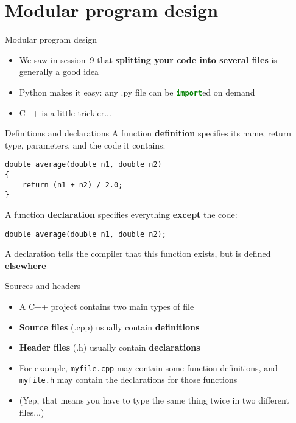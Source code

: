 \part{Modular program design}
\frame{\partpage}

\begin{frame}[fragile]{Modular program design}
    \begin{itemize}
        \item We saw in session~9 that \textbf{splitting your code into several files} is generally a good idea \pause
        \item Python makes it easy: any .py file can be \lstinline[language=Python]{import}ed on demand \pause
        \item C++ is a little trickier...
    \end{itemize}
\end{frame}

\begin{frame}[fragile]{Definitions and declarations}
    A function \textbf{definition} specifies its name, return type, parameters, and the code it contains:
    \begin{lstlisting}
double average(double n1, double n2)
{
    return (n1 + n2) / 2.0;
}
    \end{lstlisting}
    \pause
    A function \textbf{declaration} specifies everything \textbf{except} the code:
    \begin{lstlisting}
double average(double n1, double n2);
    \end{lstlisting}
    \pause
    A declaration tells the compiler that this function exists, but is defined \textbf{elsewhere}
\end{frame}

\begin{frame}[fragile]{Sources and headers}
    \begin{itemize}
        \item A C++ project contains two main types of file \pause
        \item \textbf{Source files} (.cpp) usually contain \textbf{definitions} \pause
        \item \textbf{Header files} (.h) usually contain \textbf{declarations} \pause
        \item For example, \texttt{myfile.cpp} may contain some function definitions,
            and \texttt{myfile.h} may contain the declarations for those functions \pause
        \item (Yep, that means you have to type the same thing twice in two different files...)
    \end{itemize}
\end{frame}

